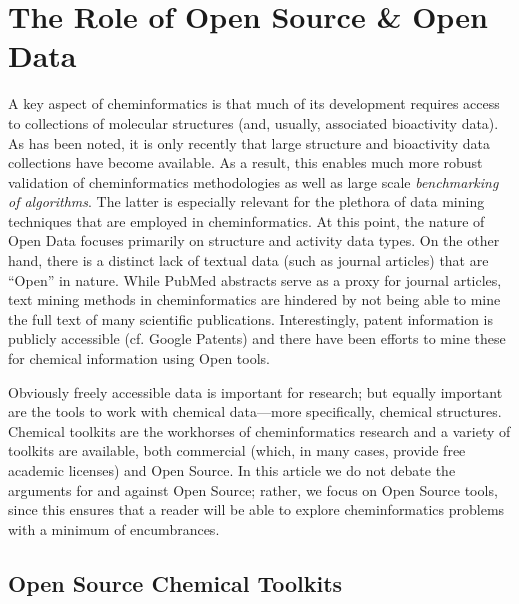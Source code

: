 \documentclass{sig-alternate}
\begin{document}
\section{The Role of Open Source \& Open Data}
\label{sec:role-open-source}

A key aspect of cheminformatics is that much of its development
requires access to collections of molecular structures (and, usually,
associated bioactivity data). As has been noted, it is only recently
that large structure and bioactivity data collections have become
available. As a result, this enables much more robust validation of
cheminformatics methodologies as well as large scale
\emph{benchmarking of algorithms}. The latter is especially relevant
for the plethora of data mining techniques that are employed in
cheminformatics. At this point, the nature of Open Data focuses
primarily on structure and activity data types. On the other hand,
there is a distinct lack of textual data (such as journal articles)
that are ``Open'' in nature. While PubMed abstracts serve as a proxy
for journal articles, text mining methods in cheminformatics are
hindered by not being able to mine the full text of many scientific
publications.  Interestingly, patent information is publicly
accessible (cf. Google Patents) and there have been efforts to mine
these for chemical information using Open tools.

Obviously freely accessible data is important for research; but
equally important are the tools to work with chemical data---more
specifically, chemical structures. Chemical toolkits are the workhorses
of cheminformatics research and a variety of toolkits are available,
both commercial (which, in many cases, provide free academic
licenses) and Open Source. In this article we do not debate the
arguments for and against Open Source; rather, we focus on Open Source
tools, since this ensures that a reader will be able to explore
cheminformatics problems with a minimum of encumbrances.

\subsection{Open Source Chemical Toolkits}
\label{sec:toolkits}
\end{document}
